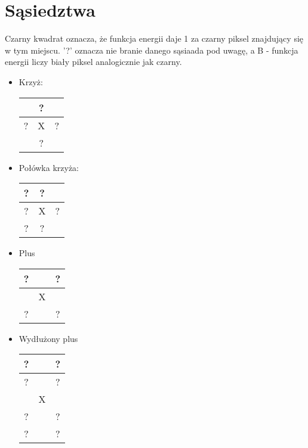 \section{Sąsiedztwa}
Czarny kwadrat oznacza, że funkcja energii daje 1 za czarny piksel znajdujący się w tym miejscu. '?' oznacza nie branie danego sąsiaada pod uwagę, a B - funkcja energii liczy biały piksel analogicznie jak czarny.
\begin{itemize}
    \item Krzyż:
    \begin{tabular}{|c|c|c|}
        \hline
        \cellcolor{black} & ? & \cellcolor{black}\\
        \hline
        ? & X & ?\\
        \hline
        \cellcolor{black} & ? & \cellcolor{black}\\
        \hline
    \end{tabular}
\item Połówka krzyża:
\begin{tabular}{|c|c|c|}
    \hline
    ? & ? & \cellcolor{black}\\
    \hline
    ? & X & ?\\
    \hline
    ? & ? & \cellcolor{black}\\
    \hline
\end{tabular}
\item Plus
\begin{tabular}{|c|c|c|}
    \hline
    ? & \cellcolor{black} & ? \\
    \hline
    \cellcolor{black} & X &\cellcolor{black}\\
    \hline
   ? &\cellcolor{black} &? \\
   \hline
\end{tabular}

\item Wydłużony plus
\begin{tabular}{|c|c|c|}
    \hline
    ? & \cellcolor{black} & ? \\
    \hline
    ? & \cellcolor{black} & ? \\
    \hline
    \cellcolor{black} & X & \cellcolor{black} \\
    \hline
    ? & \cellcolor{black} & ? \\
    \hline
    ? & \cellcolor{black} & ? \\
    \hline
    

\end{tabular}
\end{itemize}
